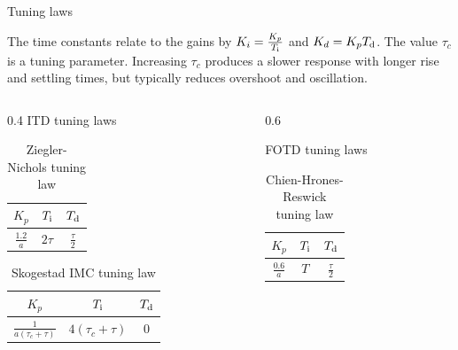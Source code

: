 \documentclass[9pt]{beamer-control}
\begin{document}
\begin{frame}{Tuning laws}

  \centering
  The time constants relate to the gains by $K_i= \frac{K_p}{T_{\mathrm{i}}}$ and $K_d = K_p T_{\mathrm{d}}$. The value $\tau_c$ is a tuning parameter. Increasing \(\tau_c\) produces a slower response with longer rise and settling times, but typically reduces overshoot and oscillation.\\
  \vspace{1cm}

  \begin{columns}
    \begin{column}{0.4\textwidth}
      ITD tuning laws
      \begin{table}
        \centering
        \begin{tabular}{|c|c|c|}
          \hline
          $K_p$ & $T_{\mathrm{i}}$ & $T_{\mathrm{d}}$\\
          \hline
          $\frac{1.2}{a}$ & $2\tau$ & $\frac{\tau}{2}$\\
          \hline
        \end{tabular}
        \caption{Ziegler-Nichols tuning law}
      \end{table}

      \begin{table}
        \centering
        \begin{tabular}{|c|c|c|}
          \hline
          $K_p$ & $T_{\mathrm{i}}$ & $T_{\mathrm{d}}$\\
          \hline
          $\frac{1}{a(\tau_c+\tau)}$ & $4(\tau_c+\tau)$ & $0$\\
          \hline
        \end{tabular}
        \caption{Skogestad IMC tuning law}
      \end{table}
    \end{column}
    \begin{column}{0.6\textwidth}

      FOTD tuning laws
      \begin{table}
        \centering
        \begin{tabular}{|c|c|c|}
          \hline
          $K_p$ & $T_{\mathrm{i}}$ & $T_{\mathrm{d}}$\\
          \hline
          $\frac{0.6}{a}$ & $T$ & $\frac{\tau}{2}$\\
          \hline
        \end{tabular}
        \caption{Chien-Hrones-Reswick tuning law}
      \end{table}


\end{column}
\end{columns}
\end{frame}
\end{document}
